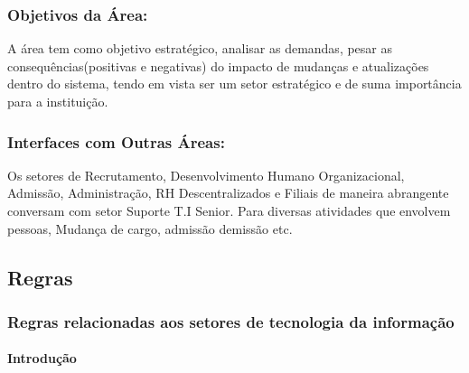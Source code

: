 \documentclass[letterpaper,10pt,portuges]{sphinxmanual}
\begin{document}
\subsubsection{Objetivos da Área:}
\label{\detokenize{visao_geral:objetivos-da-area}}
\sphinxAtStartPar
A área tem como objetivo estratégico, analisar as demandas, pesar as
consequências(positivas e negativas) do impacto de mudanças e
atualizações dentro do sistema, tendo em vista ser um setor estratégico
e de suma importância para a instituição.


\subsubsection{Interfaces com Outras Áreas:}
\label{\detokenize{visao_geral:interfaces-com-outras-areas}}
\sphinxAtStartPar
Os setores de Recrutamento, Desenvolvimento Humano Organizacional,
Admissão, Administração, RH Descentralizados e Filiais de maneira
abrangente conversam com setor Suporte T.I Senior. Para diversas
atividades que envolvem pessoas, Mudança de cargo, admissão
demissão etc.

\noindent{}

\sphinxstepscope


\subsection{Regras}
\label{\detokenize{regras:regras}}\label{\detokenize{regras::doc}}

\subsubsection{Regras relacionadas aos setores de tecnologia da informação}
\label{\detokenize{regras:regras-relacionadas-aos-setores-de-tecnologia-da-informacao}}

\paragraph{Introdução}
\label{\detokenize{regras:introducao}}
\end{document}
